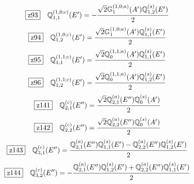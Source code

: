 \documentclass[fleqn,10pt,landscape]{jsarticle}
\begin{document}
\begin{dmath*}
\hspace*{3mm}\fbox{z93}\quad \mathbb{Q}_{1,1}^{(1,0;c)}(E^{\prime})=- \frac{\sqrt{2} \mathbb{G}_{1}^{(1,0;a)}(A^{\prime}) \mathbb{Q}_{1,2}^{(s)}(E^{\prime})}{2}
\end{dmath*}
\begin{dmath*}
\hspace*{3mm}\fbox{z94}\quad \mathbb{Q}_{1,2}^{(1,0;c)}(E^{\prime})=\frac{\sqrt{2} \mathbb{G}_{1}^{(1,0;a)}(A^{\prime}) \mathbb{Q}_{1,1}^{(s)}(E^{\prime})}{2}
\end{dmath*}
\begin{dmath*}
\hspace*{3mm}\fbox{z95}\quad \mathbb{Q}_{1,1}^{(1,1;c)}(E^{\prime})=\frac{\sqrt{2} \mathbb{Q}_{0}^{(1,1;a)}(A^{\prime}) \mathbb{Q}_{1,1}^{(s)}(E^{\prime})}{2}
\end{dmath*}
\begin{dmath*}
\hspace*{3mm}\fbox{z96}\quad \mathbb{Q}_{1,2}^{(1,1;c)}(E^{\prime})=\frac{\sqrt{2} \mathbb{Q}_{0}^{(1,1;a)}(A^{\prime}) \mathbb{Q}_{1,2}^{(s)}(E^{\prime})}{2}
\end{dmath*}
\begin{dmath*}
\hspace*{3mm}\fbox{z141}\quad \mathbb{Q}_{2,1}^{(c)}(E^{\prime\prime})=\frac{\sqrt{2} \mathbb{Q}_{2,1}^{(a)}(E^{\prime\prime}) \mathbb{Q}_{0}^{(s)}(A^{\prime})}{2}
\end{dmath*}
\begin{dmath*}
\hspace*{3mm}\fbox{z142}\quad \mathbb{Q}_{2,2}^{(c)}(E^{\prime\prime})=\frac{\sqrt{2} \mathbb{Q}_{2,2}^{(a)}(E^{\prime\prime}) \mathbb{Q}_{0}^{(s)}(A^{\prime})}{2}
\end{dmath*}
\begin{dmath*}
\hspace*{3mm}\fbox{z143}\quad \mathbb{Q}_{3,1}^{(c)}(E^{\prime\prime})=\frac{\mathbb{Q}_{2,1}^{(a)}(E^{\prime\prime}) \mathbb{Q}_{1,1}^{(s)}(E^{\prime}) - \mathbb{Q}_{2,2}^{(a)}(E^{\prime\prime}) \mathbb{Q}_{1,2}^{(s)}(E^{\prime})}{2}
\end{dmath*}
\begin{dmath*}
\hspace*{3mm}\fbox{z144}\quad \mathbb{Q}_{3,2}^{(c)}(E^{\prime\prime})=- \frac{\mathbb{Q}_{2,1}^{(a)}(E^{\prime\prime}) \mathbb{Q}_{1,2}^{(s)}(E^{\prime}) + \mathbb{Q}_{2,2}^{(a)}(E^{\prime\prime}) \mathbb{Q}_{1,1}^{(s)}(E^{\prime})}{2}
\end{dmath*}
\end{document}
